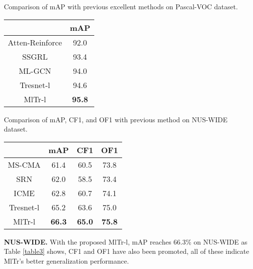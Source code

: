 \documentclass{article} \usepackage[numbers,sort&compress]{natbib}
\begin{document}
\begin{minipage}{\textwidth}
\begin{minipage}[t]{0.48\textwidth}
\makeatletter{}
\caption{Comparison of mAP with previous excellent methods on Pascal-VOC dataset.}
\label{table2}
\centering
\begin{tabular}{c|c}
\hline
\  & mAP \\
\hline
Atten-Reinforce \cite{chen2018recurrent} &92.0 \\
SSGRL \cite{chen2019learning} &93.4 \\
ML-GCN \cite{chen2019multi} &94.0\\
Tresnet-l \cite{ben2020asymmetric} &94.6\\
\hline
MlTr-l &\textbf{95.8}\\
\hline
\end{tabular}
\end{minipage}
\begin{minipage}[t]{0.48\textwidth}
\makeatletter{}
\caption{Comparison of mAP, CF1, and OF1 with previous method on NUS-WIDE dataset.}
\label{table3}
\centering
\begin{tabular}{c|c|c|c}
\hline
\  & mAP & CF1 & OF1\\
\hline
MS-CMA \cite{you2020cross} &61.4 &60.5 &73.8 \\
SRN \cite{zhu2017learning} &62.0 &58.5 &73.4 \\
ICME \cite{chen2019multi} &62.8 &60.7 &74.1 \\
Tresnet-l \cite{ben2020asymmetric} &65.2 &63.6 &75.0 \\
\hline
MlTr-l &\textbf{66.3} &\textbf{65.0} &\textbf{75.8}   \\
\hline
\end{tabular}
\end{minipage}
\end{minipage}

\textbf{NUS-WIDE.}
With the proposed MlTr-l, mAP reaches 66.3\% on NUS-WIDE as Table \textcolor{red}{\ref{table3}} shows, CF1 and OF1 have also been promoted,  all of these indicate MlTr's better generalization performance.
\end{document}
